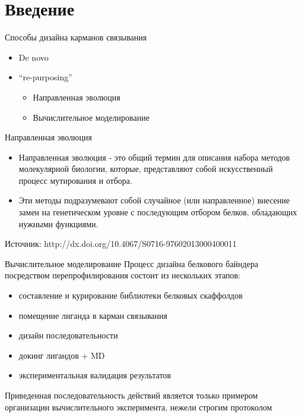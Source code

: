 \begin{frame}
[plain]
  \titlepage
\end{frame}

\section{Введение}


\begin{frame}{Способы дизайна карманов связывания}
    \large
    \begin{itemize}
        \item De novo
        \item “re-purposing”   
            \begin{itemize}
                \item  Направленная  эволюция
                \item Вычислительное моделирование
        \end{itemize}
    \end{itemize}
\end{frame}


\begin{frame}{Направленная эволюция}
\begin{itemize}
        \item Направленная эволюция - это общий термин
для описания набора методов молекулярной
биологии, которые, представляют собой
искусственный процесс мутирования и
отбора.
        \item Эти методы подразумевают собой случайное
(или направленное) внесение замен на
генетическом уровне с последующим
отбором белков, обладающих нужными
функциями.
\end{itemize}
\vspace{1cm}
Источник: http://dx.doi.org/10.4067/S0716-97602013000400011
\end{frame}


\begin{frame}{Вычислительное моделирование}
    Процесс дизайна белкового байндера посредством перепрофилирования
состоит из нескольких этапов:
    \begin{itemize}
        \item составление и курирование библиотеки белковых скаффолдов
        \item помещение лиганда в карман связывания
        \item  дизайн последовательности
        \item докинг лигандов + MD
        \item экспериментальная валидация результатов

    \end{itemize}

    Приведенная последовательность действий является только примером
организации вычислительного эксперимента, нежели строгим протоколом
\end{frame}



